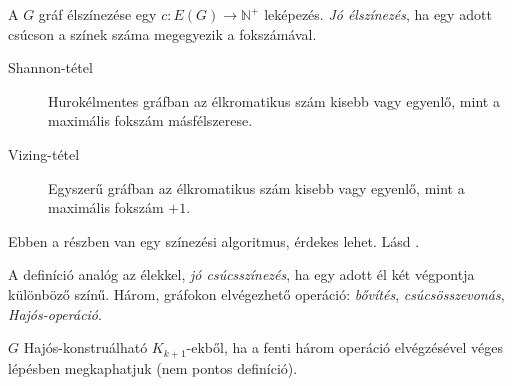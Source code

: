 \documentclass[%
	DIV=15,appendixprefix]{scrreprt}
\theoremstyle{definition}
\theoremstyle{remark}
\begin{document}
A $ G $ gráf élszínezése egy $ c \colon E \left( G \right) \rightarrow \mathbb{N}^{+} $ leképezés.
\emph{Jó élszínezés}, ha egy adott csúcson a színek száma megegyezik a fokszámával.
\begin{description}
	\item[Shannon-tétel] Hurokélmentes gráfban az élkromatikus szám kisebb vagy egyenlő, mint a
		maximális fokszám másfélszerese.
	\item[Vizing-tétel] Egyszerű gráfban az élkromatikus szám kisebb vagy egyenlő, mint a maximális
		fokszám $ + 1 $.
\end{description}
Ebben a részben van egy színezési algoritmus, érdekes lehet.
%
Lásd
\cite[\href{http://www.math.u-szeged.hu/~hajnal/courses/MSc_Diszkret/MSc_kombi13/ea-Hajos.pdf}{%
\emph{Gráfok csúcsszínezései I. -
 tétele}}]{DiMat}.

A definíció analóg az élekkel, \emph{jó csúcsszínezés}, ha egy adott él két végpontja különböző
színű. Három, gráfokon elvégezhető operáció: \emph{bővítés}, \emph{csúcsösszevonás},
\emph{Hajós-operáció}.

$ G $ Hajós-konstruálható $ K_{k+1} $-ekből, ha a fenti három operáció elvégzésével véges lépésben
megkaphatjuk (nem pontos definíció).
\end{document}
